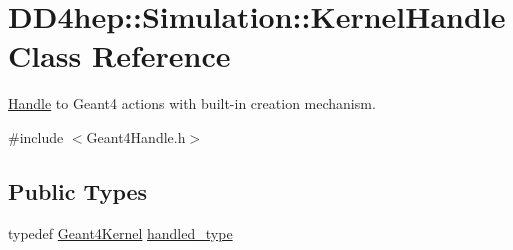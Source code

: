 \hypertarget{class_d_d4hep_1_1_simulation_1_1_kernel_handle}{
\section{DD4hep::Simulation::KernelHandle Class Reference}
\label{class_d_d4hep_1_1_simulation_1_1_kernel_handle}
}


\hyperlink{class_d_d4hep_1_1_handle}{Handle} to Geant4 actions with built-\/in creation mechanism.  


{\ttfamily \#include $<$Geant4Handle.h$>$}\subsection*{Public Types}
\begin{DoxyCompactItemize}
\item 
typedef \hyperlink{class_d_d4hep_1_1_simulation_1_1_geant4_kernel}{Geant4Kernel} \hyperlink{class_d_d4hep_1_1_simulation_1_1_kernel_handle_ab3846addea4978dab36bdb0cfb53dc34}{handled\_\-type}
\end{DoxyCompactItemize}
